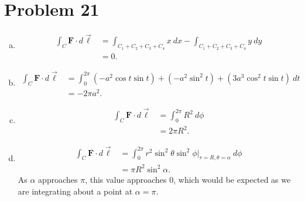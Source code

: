 \documentclass[10pt]{mypackage}
\begin{document}
\section{Problem 21}%
\begin{enumerate}[(a)]
  \item 
    \begin{align*}
      \int_{C}^{} \mathbf{F}\cdot d\vec{\ell} &= \int_{C_1+C_2 + C_3 + C_4}^{} x\:dx - \int_{C_1 + C_2 + C_3 + C_4}^{} y\:dy\\
                                              &= 0.
    \end{align*}
  \item 
    \begin{align*}
      \int_{C}^{} \mathbf{F}\cdot d\vec{\ell} &= \int_{0}^{2\pi} \left(-a^2\cos t \sin t\right) + \left(-a^2\sin^2t\right) + \left(3a^3\cos^2t\sin t\right)\:dt\\
                                              &= -2\pi a^2.
    \end{align*}
  \item 
    \begin{align*}
      \int_{C}^{} \mathbf{F}\cdot d\vec{\ell} &= \int_{0}^{2\pi} R^2\:d\phi\\
                                              &= 2\pi R^2.
    \end{align*}
  \item 
    \begin{align*}
      \int_{C}^{} \mathbf{F}\cdot d\vec{\ell} &= \int_{0}^{2\pi} r^2\sin^2\theta\sin^2\phi\bigr\vert_{r=R,\theta=\alpha}\:d\phi\\
                                              &= \pi R^2\sin^2\alpha.
    \end{align*}
    As $\alpha$ approaches $\pi$, this value approaches $0$, which would be expected as we are integrating about a point at $\alpha = \pi$.
\end{enumerate}
\end{document}
